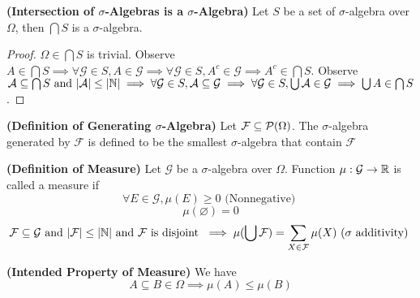 \documentclass{report}
\begin{document}
\begin{lemma}
\label{1.1.3}
\textbf{(Intersection of $\sigma$-Algebras is a $\sigma$-Algebra)} Let $S$ be a set of $\sigma$-algebra over $\Omega$, then $\bigcap S$ is a $\sigma$-algebra. 
\end{lemma}
\begin{proof}
  $\Omega\in \bigcap S$ is trivial. Observe $A\in \bigcap S\implies  \forall \mathcal{G}\in S, A\in \mathcal{G}\implies \forall \mathcal{G}\in S, A^c\in \mathcal{G}\implies A^c \in\bigcap S$. Observe $\mathcal{A}\subseteq \bigcap S\text{ and }|\mathcal{A}|\leq |\mathbb{N}|\implies \forall\mathcal{G}\in S, \mathcal{A}\subseteq \mathcal{G}\implies \forall \mathcal{G}\in S, \bigcup \mathcal{A} \in\mathcal{G}\implies \bigcup A\in \bigcap S$.
\end{proof}
\begin{definition}
\label{1.1.4}
\textbf{(Definition of Generating $\sigma$-Algebra)} Let $\mathcal{F}\subseteq \mathcal{P}(\Omega)$. The $\sigma$-algebra generated by $\mathcal{F}$ is defined to be the smallest  $\sigma$-algebra that contain $\mathcal{F}$
\end{definition}
\begin{definition}
\label{1.1.8}
  \textbf{(Definition of Measure)} Let $\mathcal{G}$ be a $\sigma$-algebra over $\Omega$. Function $\mu:\mathcal{G}\rightarrow \mathbb{R}$ is called a measure if
\begin{equation}
\forall E\in \mathcal{G}, \mu(E)\geq 0\text{ (Nonnegative) }
\end{equation}  
\begin{equation}
\mu(\varnothing)=0
\end{equation}
\begin{equation}
\mathcal{F}\subseteq \mathcal{G}\text{ and }|\mathcal{F}|\leq |\mathbb{N}|\text{ and }\mathcal{F}\text{ is disjoint }\implies \mu(\bigcup  \mathcal{F})=\sum_{X\in \mathcal{F}} \mu(X)\text{ ($\sigma$ additivity) }
\end{equation}
\end{definition}
\begin{theorem}
\textbf{(Intended Property of Measure)} We have
\begin{equation}
A\subseteq B\in \Omega\implies \mu(A)\leq  \mu(B)
\end{equation}
\end{theorem}
\end{document}
